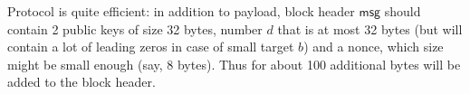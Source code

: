 \documentclass[]{article}
\newcommand{\msg}{\mathsf{msg}}
\begin{document}
    Protocol is quite efficient: in addition to payload, block header $\msg$ should
    contain 2 public keys of size 32 bytes, number $d$ that is at most 32 bytes
    (but will contain a lot of leading zeros in case of small target $b$) and a nonce,
    which size might be small enough (say, 8 bytes). Thus for about 100 additional bytes
    will be added to the block header.



    
\end{document}
